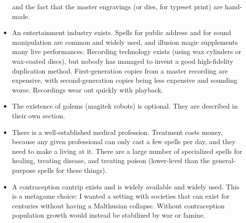 \begin{itemize}
and the fact that the master engravings (or dies, for typeset print) are
hand-made.
%
\item An entertainment industry exists. Spells for public address and for
sound manipulation are common and widely used, and illusion magic
supplements many live performances. Recording technology exists (using wax
cylinders or wax-coated discs), but nobody has managed to invent a good
high-fidelity duplication method. First-generation copies from a master
recording are expensive, with second-generation copies being less expensive
and sounding worse. Recordings wear out quickly with playback.
%
\item The existence of golems (magitek robots) is optional. They are
described in their own section.
%
\item There is a well-established medical profession. Treatment costs money,
because any given professional can only cast a few spells per day, and they
need to make a living at it. There are a large number of specialized spells
for healing, treating disease, and treating poison (lower-level than the
general-purpose spells for these things).
%
\item A contraception cantrip exists and is widely available and widely
used. This is a metagame choice: I wanted a setting with societies that can
exist for centuries without having a Malthusian collapse. Without
contraception population growth would instead be stabilized by war or famine.
%
\end{itemize}

%
